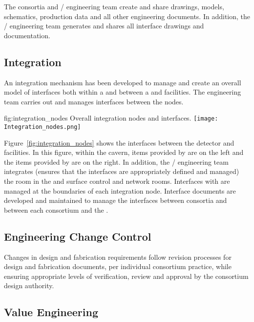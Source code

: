 The consortia and / engineering team create and share
drawings, models, schematics, production data and all other
engineering documents. In addition, the / engineering team
generates and shares all interface drawings and documentation.

\subsection{Integration}
\label{sec:es-tc-integ}

 An integration mechanism has been developed to manage and create an overall model of interfaces both within a  and between a  and facilities.
 The  engineering team carries out  and manages interfaces between the nodes.

\begin{dunefigure}{fig:integration_nodes}
  {Overall integration nodes and interfaces.}
  \texttt{[image: Integration\_nodes.png]}
\end{dunefigure}

Figure~\ref{fig:integration_nodes} shows the interfaces between the
detector and facilities. In this figure, within the cavern, items
provided by  are on the left and the items provided by
 are on the right. 
In addition, the / engineering
team integrates (ensures that the interfaces are appropriately defined
and managed) the  room in the  and surface
control and network rooms. Interfaces with 
are managed at the boundaries of each integration node. 
Interface documents are developed and maintained to manage the
interfaces between consortia and between each consortium and the
.

\subsection{Engineering Change Control}

Changes in design and fabrication requirements follow revision
processes for design and fabrication documents, per individual
consortium practice, while ensuring appropriate levels of
verification, review and approval by the consortium design authority.

\subsection{Value Engineering}
\label{sec:es-tc-fdsp-coord-ve}

